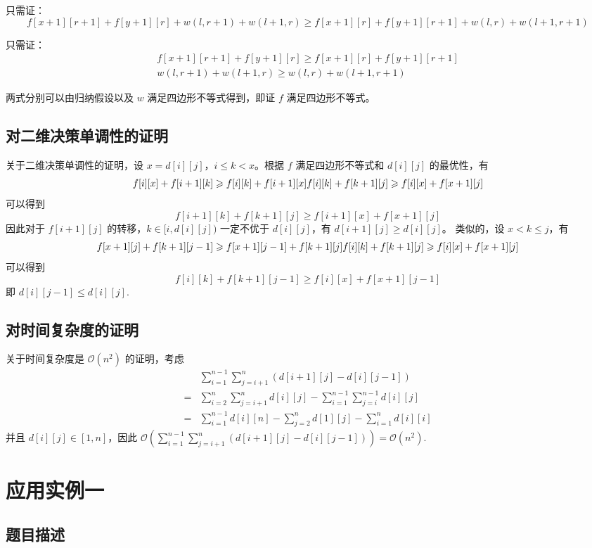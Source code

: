 只需证： \[f[x+1][r+1]+f[y+1][r]+w(l,r+1)+w(l+1,r)\ge f[x+1][r]+f[y+1][r+1]+w(l,r)+w(l+1,r+1)
\]

只需证： \[
\begin{array}{c}
f[x+1][r+1]+f[y+1][r]\ge f[x+1][r]+f[y+1][r+1]\\
w(l,r+1)+w(l+1,r)\ge w(l,r)+w(l+1,r+1)
\end{array}
\]

两式分别可以由归纳假设以及 \(w\) 满足四边形不等式得到，即证 \(f\)
满足四边形不等式。

\subsection{对二维决策单调性的证明}

关于二维决策单调性的证明，设 \(x=d[i][j]\)，\(i\le k < x\)。根据 \(f\)
满足四边形不等式和 \(d[i][j]\) 的最优性，有 \[
f[i][x]+f[i+1][k]\ge f[i][k]+f[i+1][x]\\
f[i][k]+f[k+1][j]\ge f[i][x]+f[x+1][j]
\] 可以得到 \[
f[i+1][k]+f[k+1][j]\ge f[i+1][x]+f[x+1][j]
\] 因此对于 \(f[i+1][j]\) 的转移，\(k\in [i,d[i][j])\) 一定不优于
\(d[i][j]\)，有 \(d[i+1][j]\ge d[i][j]\)。
类似的，设 \(x < k\le j\)，有 \[
f[x+1][j]+f[k+1][j-1]\ge f[x+1][j-1]+f[k+1][j]\\
f[i][k]+f[k+1][j]\ge f[i][x]+f[x+1][j]
\] 可以得到 \[
f[i][k]+f[k+1][j-1]\ge f[i][x]+f[x+1][j-1]
\] 即 \(d[i][j-1]\le d[i][j]\).

\subsection{对时间复杂度的证明}

关于时间复杂度是 \(\mathcal{O}(n^2)\) 的证明，考虑 \[
\begin{aligned}
&\sum_{i=1}^{n-1}\sum_{j=i+1}^n(d[i+1][j]-d[i][j-1])\\
=&\sum_{i=2}^n\sum_{j=i+1}^nd[i][j]-\sum_{i=1}^{n-1}\sum_{j=i}^{n-1}d[i][j]\\
=&\sum_{i=1}^{n-1}d[i][n]-\sum_{j=2}^nd[1][j]-\sum_{i=1}^nd[i][i]
\end{aligned}
\]
并且 \(d[i][j]\in[1,n]\)，因此
\(\mathcal{O}(\sum_{i=1}^{n-1}\sum_{j=i+1}^n(d[i+1][j]-d[i][j-1]))=\mathcal{O}(n^2)\).

\section{应用实例一}

\subsection{题目描述}

